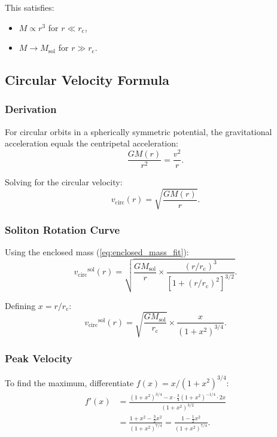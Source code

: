 \documentclass[11pt,a4paper]{article}
\newcommand{\Msol}{\ensuremath{M_{\mathrm{sol}}}}
\newcommand{\rc}{\ensuremath{r_{\mathrm{c}}}}
\newcommand{\vcirc}{\ensuremath{v_{\mathrm{circ}}}}
\theoremstyle{definition}
\theoremstyle{remark}
\begin{document}
This satisfies:
\begin{itemize}
    \item $M \propto r^3$ for $r \ll \rc$,
    \item $M \to \Msol$ for $r \gg \rc$.
\end{itemize}

\subsection{Circular Velocity Formula}
\label{sec:vcirc}

\subsubsection{Derivation}

For circular orbits in a spherically symmetric potential, the gravitational acceleration equals the centripetal acceleration:
\begin{equation}
\frac{G M(r)}{r^2} = \frac{v^2}{r}.
\end{equation}

Solving for the circular velocity:
\begin{equation}
\label{eq:vcirc_general}
\boxed{\vcirc(r) = \sqrt{\frac{G M(r)}{r}}.}
\end{equation}

\subsubsection{Soliton Rotation Curve}

Using the enclosed mass (\ref{eq:enclosed_mass_fit}):
\begin{equation}
\label{eq:vcirc_soliton}
\vcirc^{\mathrm{sol}}(r) = \sqrt{\frac{G \Msol}{r} \times \frac{(r/\rc)^3}{[1 + (r/\rc)^2]^{3/2}}}.
\end{equation}

Defining $x = r/\rc$:
\begin{equation}
\vcirc^{\mathrm{sol}}(r) = \sqrt{\frac{G \Msol}{\rc}} \times \frac{x}{(1 + x^2)^{3/4}}.
\end{equation}

\subsubsection{Peak Velocity}

To find the maximum, differentiate $f(x) = x/(1+x^2)^{3/4}$:
\begin{align}
f'(x) &= \frac{(1+x^2)^{3/4} - x \cdot \frac{3}{4}(1+x^2)^{-1/4} \cdot 2x}{(1+x^2)^{3/2}} \\
&= \frac{1 + x^2 - \frac{3}{2}x^2}{(1+x^2)^{7/4}} = \frac{1 - \frac{1}{2}x^2}{(1+x^2)^{7/4}}.
\end{align}
\end{document}
